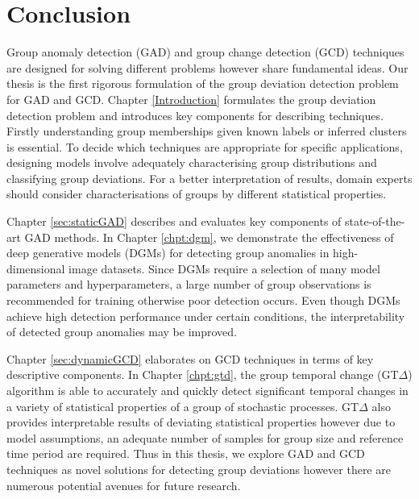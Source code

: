 
\chapter{Conclusion} \label{sec:overallC}
Group anomaly detection (GAD) and group change detection (GCD) techniques are designed for solving different problems however share fundamental ideas. Our thesis is the first rigorous formulation of the group deviation detection problem for GAD and GCD.   
Chapter \ref{Introduction} formulates the group deviation detection problem and introduces key components for describing techniques. %
 Firstly understanding group memberships given known labels or inferred clusters is essential. To decide which techniques are appropriate for specific applications, designing models involve adequately  characterising group distributions and classifying group deviations.  For a better interpretation of results, domain experts should consider characterisations of groups by different statistical properties. %

 
 Chapter \ref{sec:staticGAD} describes and evaluates key components of state-of-the-art GAD methods. In  Chapter \ref{chpt:dgm}, we demonstrate the effectiveness of deep generative models (DGMs) for detecting group anomalies in high-dimensional image datasets. Since DGMs require a selection of many model parameters and  hyperparameters, a  large number of group observations is recommended for training otherwise poor detection occurs. Even though DGMs achieve high detection performance under certain conditions, the interpretability of detected group anomalies may be improved.
 

Chapter \ref{sec:dynamicGCD} elaborates on GCD techniques in terms of key descriptive components.  In Chapter \ref{chpt:gtd}, the group temporal change  (GT$\Delta$) algorithm is able to accurately and quickly detect significant temporal changes in a variety of statistical properties of a group of stochastic processes. GT$\Delta$ also provides interpretable results of deviating statistical properties however due to model assumptions, an adequate number of samples for group size and reference time period are required. Thus in this thesis, we explore GAD and GCD techniques as novel solutions for detecting group deviations however there are numerous potential avenues for  future research. %
 
 
     
